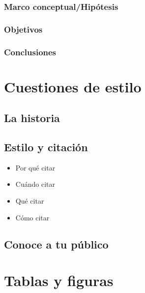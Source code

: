 \documentclass[
]{book}
\providecommand{\tightlist}{%
  \setlength{\itemsep}{0pt}\setlength{\parskip}{0pt}}
\begin{document}
\hypertarget{marco-conceptualhipuxf3tesis}{%
\subsection{Marco conceptual/Hipótesis}\label{marco-conceptualhipuxf3tesis}}

\hypertarget{objetivos}{%
\subsection{Objetivos}\label{objetivos}}

\hypertarget{conclusiones}{%
\subsection{Conclusiones}\label{conclusiones}}

\hypertarget{cuestiones-de-estilo}{%
\chapter{Cuestiones de estilo}\label{cuestiones-de-estilo}}

\hypertarget{la-historia}{%
\section{La historia}\label{la-historia}}

\hypertarget{estilo-y-citaciuxf3n}{%
\section{Estilo y citación}\label{estilo-y-citaciuxf3n}}

\begin{itemize}
\tightlist
\item
  Por qué citar
\item
  Cuándo citar
\item
  Qué citar
\item
  Cómo citar
\end{itemize}

\hypertarget{conoce-a-tu-puxfablico}{%
\section{Conoce a tu público}\label{conoce-a-tu-puxfablico}}

\hypertarget{tablas-y-figuras}{%
\chapter{Tablas y figuras}\label{tablas-y-figuras}}
\end{document}
